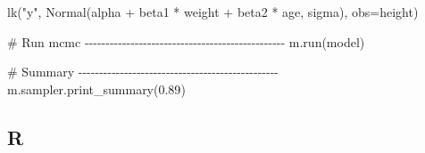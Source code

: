 \documentclass[
  letterpaper,
  DIV=11,
  numbers=noendperiod]{scrreprt}
\newenvironment{Shaded}{\begin{snugshade}}{\end{snugshade}}
\newcommand{\CommentTok}[1]{\textcolor[rgb]{0.37,0.37,0.37}{#1}}
\newcommand{\FloatTok}[1]{\textcolor[rgb]{0.68,0.00,0.00}{#1}}
\newcommand{\NormalTok}[1]{\textcolor[rgb]{0.00,0.23,0.31}{#1}}
\newcommand{\OperatorTok}[1]{\textcolor[rgb]{0.37,0.37,0.37}{#1}}
\newcommand{\StringTok}[1]{\textcolor[rgb]{0.13,0.47,0.30}{#1}}
\begin{document}
\begin{Shaded}
\begin{Highlighting}[]
\NormalTok{    lk(}\StringTok{"y"}\NormalTok{, Normal(alpha }\OperatorTok{+}\NormalTok{ beta1 }\OperatorTok{*}\NormalTok{ weight }\OperatorTok{+}\NormalTok{ beta2 }\OperatorTok{*}\NormalTok{ age, sigma), obs}\OperatorTok{=}\NormalTok{height)}

\CommentTok{\# Run mcmc {-}{-}{-}{-}{-}{-}{-}{-}{-}{-}{-}{-}{-}{-}{-}{-}{-}{-}{-}{-}{-}{-}{-}{-}{-}{-}{-}{-}{-}{-}{-}{-}{-}{-}{-}{-}{-}{-}{-}{-}{-}{-}{-}{-}{-}{-}{-}{-}}
\NormalTok{m.run(model) }

\CommentTok{\# Summary {-}{-}{-}{-}{-}{-}{-}{-}{-}{-}{-}{-}{-}{-}{-}{-}{-}{-}{-}{-}{-}{-}{-}{-}{-}{-}{-}{-}{-}{-}{-}{-}{-}{-}{-}{-}{-}{-}{-}{-}{-}{-}{-}{-}{-}{-}{-}{-}}
\NormalTok{m.sampler.print\_summary(}\FloatTok{0.89}\NormalTok{)}
\end{Highlighting}
\end{Shaded}

\subsection{R}
\end{document}
